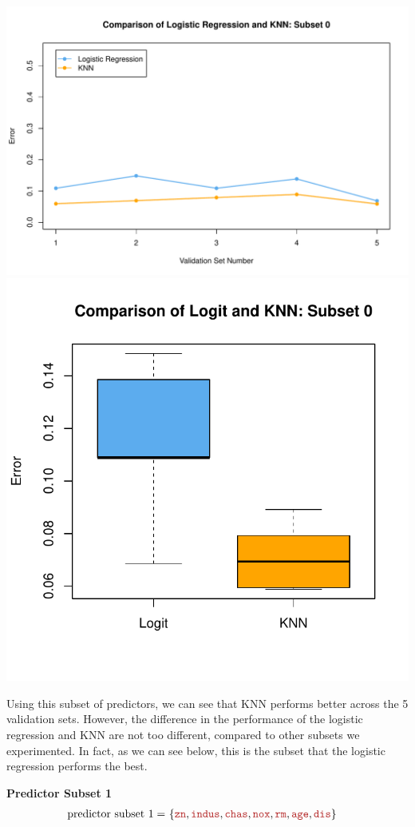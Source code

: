 \documentclass{article}
\begin{document}
\begin{center}
    \includegraphics[width=0.8\linewidth]{Images/Prob5/Prob5-13-Plot-Subset0.pdf}
    \includegraphics[width=0.45\linewidth]{Images/Prob5/Prob5-13-Boxplot-Subset0.pdf}
\end{center}

Using this subset of predictors, we can see that KNN performs better across the 5 validation sets. However, the difference in the performance of the logistic regression and KNN are not too different, compared to other subsets we experimented. In fact, as we can see below, this is the subset that the logistic regression performs the best.
\bigskip




\noindent\textbf{Predictor Subset 1}
\[
    \begin{aligned}
    \text{predictor subset 1} =&\ 
    \{ 
    \feat{zn}, \feat{indus}, \feat{chas}, \feat{nox}, \feat{rm}, \feat{age}, \feat{dis}
    \}
    \end{aligned}
\]
\end{document}
